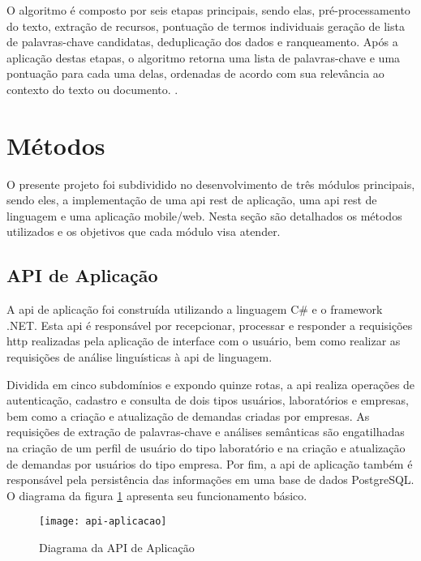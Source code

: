 O algoritmo é composto por seis etapas principais, sendo elas, pré-processamento do texto, extração de recursos, pontuação de termos individuais geração de lista de palavras-chave candidatas, deduplicação dos dados e ranqueamento. Após a aplicação destas etapas, o algoritmo retorna uma lista de palavras-chave e uma pontuação para cada uma delas, ordenadas de acordo com sua relevância ao contexto do texto ou documento. \cite{YakeKeywordExtractor}.

\section{Métodos}\label{sec:metodo}

O presente projeto foi subdividido no desenvolvimento de três módulos principais, sendo eles, a implementação de uma \gls{api} \gls{rest} de aplicação, uma \gls{api} \gls{rest} de linguagem e uma aplicação mobile/web. Nesta seção são detalhados os métodos utilizados e os objetivos que cada módulo visa atender.

\subsection{API de Aplicação}\label{subsec:app_api}

A \gls{api} de aplicação foi construída utilizando a linguagem C{\#} e o framework .NET. Esta \gls{api} é responsável por recepcionar, processar e responder a requisições \gls{http} realizadas pela aplicação de interface com o usuário, bem como realizar as requisições de análise linguísticas à \gls{api} de linguagem.

Dividida em cinco subdomínios e expondo quinze rotas, a \gls{api} realiza operações de autenticação, cadastro e consulta de dois tipos usuários, laboratórios e empresas, bem como a criação e atualização de demandas criadas por empresas. As requisições de extração de palavras-chave e análises semânticas são engatilhadas na criação de um perfil de usuário do tipo laboratório e na criação e atualização de demandas por usuários do tipo empresa. Por fim, a \gls{api} de aplicação também é responsável pela persistência das informações em uma base de dados PostgreSQL. O diagrama da figura \ref{fig:api_aplicacao} apresenta seu funcionamento básico.

\begin{figure}[htb]
    \caption{Diagrama da API de Aplicação}
    \texttt{[image: api-aplicacao]}
    \label{fig:api_aplicacao}
\end{figure}

